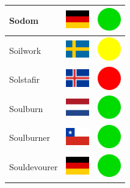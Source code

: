 \documentclass[12pt, a4paper, twoside]{report}
\begin{document}
\begin{center}
\begin{longtable}{|p{5cm}|p{2cm}|p{2cm}|}
 Sodom                                                      & \includegraphics[width=1cm]{../4x3/de} &   \includegraphics[width=1cm]{../likes/y} \\ \hline
 Soilwork                                                   & \includegraphics[width=1cm]{../4x3/se} &   \includegraphics[width=1cm]{../likes/m} \\ \hline
 Solstafir                                                  & \includegraphics[width=1cm]{../4x3/is} &   \includegraphics[width=1cm]{../likes/n} \\ \hline
 Soulburn                                                   & \includegraphics[width=1cm]{../4x3/nl} &   \includegraphics[width=1cm]{../likes/y} \\ \hline
 Soulburner                                                 & \includegraphics[width=1cm]{../4x3/cl} &   \includegraphics[width=1cm]{../likes/y} \\ \hline
 Souldevourer                                               & \includegraphics[width=1cm]{../4x3/de} &   \includegraphics[width=1cm]{../likes/y} \\ \hline

\end{longtable}
\end{center}
\end{document}
